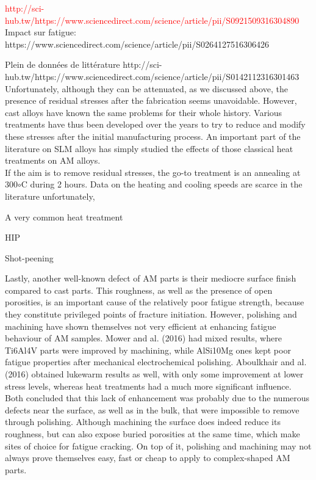 \textcolor{red}{http://sci-hub.tw/https://www.sciencedirect.com/science/article/pii/S0921509316304890}\\

Impact sur fatigue:
https://www.sciencedirect.com/science/article/pii/S0264127516306426

Plein de données de littérature
http://sci-hub.tw/https://www.sciencedirect.com/science/article/pii/S0142112316301463 \\

Unfortunately, although they can be attenuated, as we discussed above, the presence of residual stresses after the fabrication seems unavoidable. However, cast alloys have known the same problems for their whole history. Various treatments have thus been developed over the years to try to reduce and modify these stresses after the initial manufacturing process. An important part of the literature on SLM alloys has simply studied the effects of those classical heat treatments on AM alloys.\\

If the aim is to remove residual stresses, the go-to treatment is an annealing at 300$\circ$C during 2 hours. Data on the heating and cooling speeds are scarce in the literature unfortunately,

A very common heat treatment 

HIP

Shot-peening

Lastly, another well-known defect of AM parts is their mediocre surface finish compared to cast parts. This roughness, as well as the presence of open porosities, is an important cause of the relatively poor fatigue strength, because they constitute privileged points of fracture initiation. However, polishing and machining have shown themselves not very efficient at enhancing fatigue behaviour of AM samples. Mower and al. (2016)\cite{MOWER2016198} had mixed results, where Ti6Al4V parts were improved by machining, while AlSi10Mg ones kept poor fatigue properties after mechanical electrochemical polishing. Aboulkhair and al. (2016) \cite{ABOULKHAIR2016bis} obtained lukewarm results as well, with only some improvement at lower stress levels, whereas heat treatments had a much more significant influence. Both concluded that this lack of enhancement was probably due to the numerous defects near the surface, as well as in the bulk, that were impossible to remove through polishing. Although machining the surface does indeed reduce its roughness, but can also expose buried porosities at the same time, which make sites of choice for fatigue cracking. On top of it, polishing and machining may not always prove themselves easy, fast or cheap to apply to complex-shaped AM parts.\\

